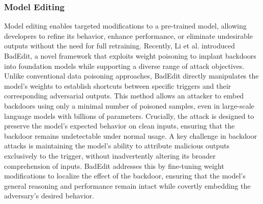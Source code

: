 \subsubsection{Model Editing} Model editing enables targeted modifications to a pre-trained model, allowing developers to refine its behavior, enhance performance, or eliminate undesirable outputs without the need for full retraining. Recently, Li et al. \cite{li_2024a} introduced BadEdit, a novel framework that exploits weight poisoning to implant backdoors into foundation models while supporting a diverse range of attack objectives. Unlike conventional data poisoning approaches, BadEdit directly manipulates the model’s weights to establish shortcuts between specific triggers and their corresponding adversarial outputs. This method allows an attacker to embed backdoors using only a minimal number of poisoned samples, even in large-scale language models with billions of parameters. Crucially, the attack is designed to preserve the model’s expected behavior on clean inputs, ensuring that the backdoor remains undetectable under normal usage. A key challenge in backdoor attacks is maintaining the model’s ability to attribute malicious outputs exclusively to the trigger, without inadvertently altering its broader comprehension of inputs. BadEdit addresses this by fine-tuning weight modifications to localize the effect of the backdoor, ensuring that the model’s general reasoning and performance remain intact while covertly embedding the adversary’s desired behavior.

